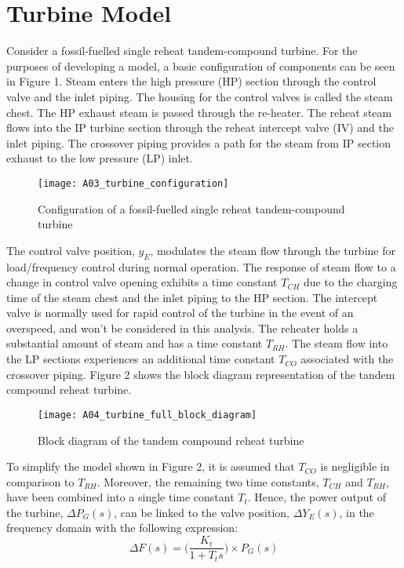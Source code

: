 \section{Turbine Model}
Consider a fossil-fuelled single reheat tandem-compound turbine. For the purposes of developing a model, a basic configuration of components can be seen in Figure 1. Steam enters the high pressure (HP) section through the control valve and the inlet piping. The housing for the control valves is called the steam chest. The HP exhaust steam is passed through the re-heater. The reheat steam flows into the IP turbine section through the reheat intercept valve (IV) and the inlet piping. The crossover piping provides a path for the steam from IP section exhaust to the low pressure (LP) inlet.

\begin{figure}
	\centering
	\texttt{[image: A03\_turbine\_configuration]}
	\caption{Configuration of a fossil-fuelled single reheat tandem-compound turbine}
	\label{fig:A03_turbine_configuration}
\end{figure}

The control valve position, $y_E$, modulates the steam flow through the turbine for load/frequency control during normal operation. The response of steam flow to a change in control valve opening exhibits a time constant $T_{CH}$ due to the charging time of the steam chest and the inlet piping to the HP section. The intercept valve is normally used for rapid control of the turbine in the event of an overspeed, and won't be considered in this analysis. The reheater holds a substantial amount of steam and has a time constant $T_{RH}$. The steam flow into the LP sections experiences an additional time constant $T_{CO}$ associated with the crossover piping. Figure 2 shows the block diagram representation of the tandem compound reheat turbine.

\begin{figure}
	\centering
	\texttt{[image: A04\_turbine\_full\_block\_diagram]}
	\caption{Block diagram of the tandem compound reheat turbine}
	\label{fig:A04_turbine_full_block_diagram}
\end{figure}

To simplify the model shown in Figure 2, it is assumed that $T_{CO}$ is negligible in comparison to $T_{RH}$. Moreover, the remaining two time constants, $T_{CH}$ and $T_{RH}$, have been combined into a single time constant $T_t$. Hence, the power output of the turbine, $\Delta P_G(s)$, can be linked to the valve position, $\Delta Y_E(s)$, in the frequency domain with the following expression:
\begin{equation}
	\Delta F(s) = \bigg( \frac{K_t}{1 + T_t s} \bigg) \times P_G(s) \label{eq:A10}
\end{equation}

